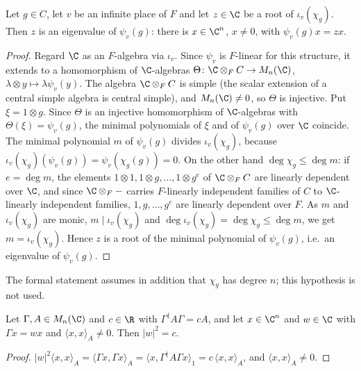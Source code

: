 \begin{lemma}\label{pf:hlf-cech:eig}
Let $g\in C$, let $v$ be an infinite place of $F$ and let $z\in\C$ be a root of $\iota_v(\chi_g)$. Then $z$ is an eigenvalue of
$\psi_v(g)$: there is $x\in\C^n$, $x\ne0$, with $\psi_v(g)x=zx$.
\end{lemma}

\begin{proof}
Regard $\C$ as an $F$-algebra via $\iota_v$. Since $\psi_v$ is $F$-linear for this structure, it extends to a homomorphism of
$\C$-algebras $\Theta\colon\C\otimes_FC\to M_n(\C)$, $\lambda\otimes y\mapsto\lambda\psi_v(y)$. The algebra $\C\otimes_FC$ is simple
(the scalar extension of a central simple algebra is central simple), and $M_n(\C)\ne0$, so $\Theta$ is injective.
Put $\xi=1\otimes g$. Since $\Theta$ is an injective homomorphism of $\C$-algebras with $\Theta(\xi)=\psi_v(g)$, the minimal polynomials of
$\xi$ and of $\psi_v(g)$ over $\C$ coincide. The minimal polynomial $m$ of $\psi_v(g)$ divides $\iota_v(\chi_g)$, because
$\iota_v(\chi_g)(\psi_v(g))=\psi_v(\chi_g(g))=0$. On the other hand $\deg\chi_g\le\deg m$: if $e=\deg m$, the elements
$1\otimes1,1\otimes g,\dots,1\otimes g^e$ of $\C\otimes_FC$ are linearly dependent over $\C$, and since $\C\otimes_F-$ carries
$F$-linearly independent families of $C$ to $\C$-linearly independent families, $1,g,\dots,g^e$ are linearly dependent over $F$. As $m$
and $\iota_v(\chi_g)$ are monic, $m\mid\iota_v(\chi_g)$ and $\deg\iota_v(\chi_g)=\deg\chi_g\le\deg m$, we get $m=\iota_v(\chi_g)$. Hence $z$ is
a root of the minimal polynomial of $\psi_v(g)$, i.e.\ an eigenvalue of $\psi_v(g)$.
\end{proof}

\begin{remark}\label{pf:hlf-cech:rem:eig}
The formal statement assumes in addition that $\chi_g$ has degree $n$; this hypothesis is not used.
\end{remark}

\begin{lemma}\label{pf:hlf-cech:normsqform}
Let $\Gamma,A\in M_n(\C)$ and $c\in\R$ with $\Gamma^\dagger A\Gamma=cA$, and let $x\in\C^n$ and $w\in\C$ with $\Gamma x=wx$ and
$\langle x,x\rangle_A\ne0$. Then $|w|^2=c$.
\end{lemma}

\begin{proof}
$|w|^2\langle x,x\rangle_A=\langle\Gamma x,\Gamma x\rangle_A=\langle x,\Gamma^\dagger A\Gamma x\rangle_{1}=c\,\langle x,x\rangle_A$, and
$\langle x,x\rangle_A\ne0$.
\end{proof}

